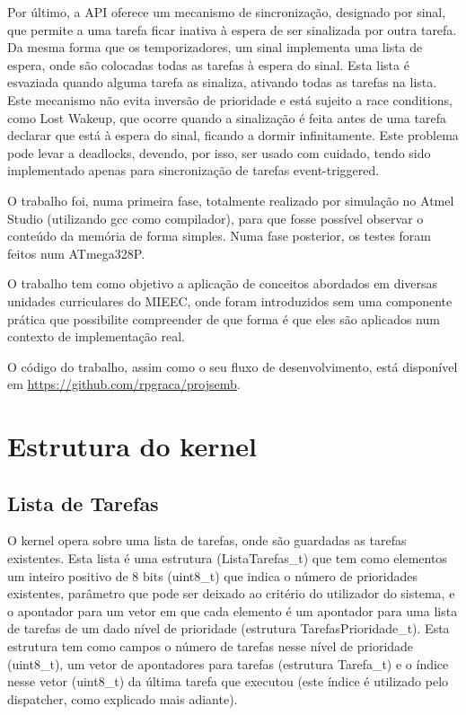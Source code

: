 \documentclass[journal]{IEEEtran}
\begin{document}
Por último, a API oferece um mecanismo de sincronização, designado por sinal, que permite a uma tarefa ficar inativa à espera de ser sinalizada por outra tarefa.
Da mesma forma que os temporizadores, um sinal implementa uma lista de espera, onde são colocadas todas as tarefas à espera do sinal.
Esta lista é esvaziada quando alguma tarefa as sinaliza, ativando todas as tarefas na lista.
Este mecanismo não evita inversão de prioridade e está sujeito a race conditions, como Lost Wakeup, que ocorre quando a sinalização é feita antes de uma tarefa declarar
que está à espera do sinal, ficando a dormir infinitamente.
Este problema pode levar a deadlocks, devendo, por isso, ser usado com cuidado, tendo sido implementado apenas para sincronização de tarefas event-triggered.

O trabalho foi, numa primeira fase, totalmente realizado por simulação no Atmel Studio (utilizando gcc como compilador), para que fosse possível observar o conteúdo da
memória de forma simples.
Numa fase posterior, os testes foram feitos num ATmega328P.

O trabalho tem como objetivo a aplicação de conceitos abordados em diversas unidades curriculares do MIEEC, onde foram introduzidos sem uma componente prática que
possibilite compreender de que forma é que eles são aplicados num contexto de implementação real.

O código do trabalho, assim como o seu fluxo de desenvolvimento, está disponível em \url{https://github.com/rpgraca/projsemb}.

\section{Estrutura do kernel}

\subsection{Lista de Tarefas}
O kernel opera sobre uma lista de tarefas, onde são guardadas as tarefas existentes.
Esta lista é uma estrutura (ListaTarefas\_t) que tem como elementos um inteiro positivo de 8 bits (uint8\_t) que indica o número de prioridades existentes, parâmetro que pode ser deixado ao
critério do utilizador do sistema, e o apontador para um vetor em que cada elemento é um apontador para uma lista de tarefas de um dado nível de prioridade (estrutura
TarefasPrioridade\_t).
Esta estrutura tem como campos o número de tarefas nesse nível de prioridade (uint8\_t), um vetor de apontadores para tarefas (estrutura Tarefa\_t) e o índice nesse vetor
(uint8\_t) da última
tarefa que executou (este índice é utilizado pelo dispatcher, como explicado mais adiante).
\end{document}

